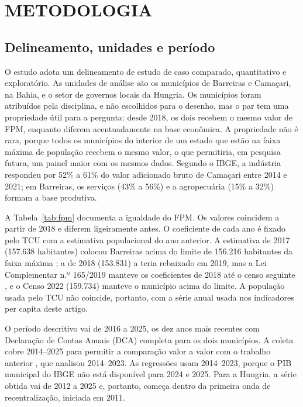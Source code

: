 \section{METODOLOGIA}\label{sec:metodologia}

\subsection{Delineamento, unidades e período}

O estudo adota um delineamento de estudo de caso comparado, quantitativo e exploratório. As unidades de análise são os municípios de Barreiras e Camaçari, na Bahia, e o setor de governos locais da Hungria. Os municípios foram atribuídos pela disciplina, e não escolhidos para o desenho, mas o par tem uma propriedade útil para a pergunta: desde 2018, os dois recebem o mesmo valor de FPM, enquanto diferem acentuadamente na base econômica. A propriedade não é rara, porque todos os municípios do interior de um estado que estão na faixa máxima de população recebem o mesmo valor, o que permitiria, em pesquisa futura, um painel maior com os mesmos dados. Segundo o IBGE, a indústria respondeu por 52\% a 61\% do valor adicionado bruto de Camaçari entre 2014 e 2021; em Barreiras, os serviços (43\% a 56\%) e a agropecuária (15\% a 32\%) formam a base produtiva.

A Tabela~\ref{tab:fpm} documenta a igualdade do FPM. Os valores coincidem a partir de 2018 e diferem ligeiramente antes. O coeficiente de cada ano é fixado pelo TCU com a estimativa populacional do ano anterior. A estimativa de 2017 (157.638 habitantes) colocou Barreiras acima do limite de 156.216 habitantes da faixa máxima \citep{DL1881}; a de 2018 (153.831) a teria rebaixado em 2019, mas a Lei Complementar n.º 165/2019 manteve os coeficientes de 2018 até o censo seguinte \citep{LC165}, e o Censo 2022 (159.734) manteve o município acima do limite. A população usada pelo TCU não coincide, portanto, com a série anual usada nos indicadores per capita deste artigo.



O período descritivo vai de 2016 a 2025, os dez anos mais recentes com Declaração de Contas Anuais (DCA) completa para os dois municípios. A coleta cobre 2014--2025 para permitir a comparação valor a valor com o trabalho anterior \citep{DutraP1}, que analisou 2014--2023. As regressões usam 2014--2023, porque o PIB municipal do IBGE não está disponível para 2024 e 2025. Para a Hungria, a série obtida vai de 2012 a 2025 e, portanto, começa dentro da primeira onda de recentralização, iniciada em 2011.

